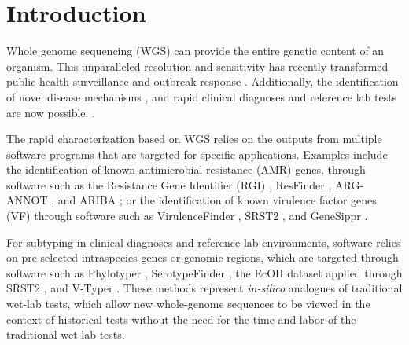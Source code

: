 \documentclass{article}
\begin{document}
\section{Introduction}

Whole genome sequencing (WGS) can provide the entire genetic content of an organism. This unparalleled resolution and sensitivity has recently transformed public-health surveillance and outbreak response \cite{ronholm2016navigating,lytsy2017time}. Additionally, the identification of novel disease mechanisms \cite{wang2014whole,yuen2015whole}, and rapid clinical diagnoses and reference lab tests are now possible. \cite{willig2015whole,dewey2014clinical}.

The rapid characterization based on WGS relies on the outputs from multiple software programs that are targeted for specific applications. Examples include the identification of known antimicrobial resistance (AMR) genes, through software such as the Resistance Gene Identifier (RGI) \cite{mcarthur2013comprehensive}, ResFinder \cite{kleinheinz2014applying}, ARG-ANNOT \cite{gupta2014arg}, and ARIBA \cite{hunt2017ariba}; or the identification of known virulence factor genes (VF) through software such as VirulenceFinder \cite{kleinheinz2014applying}, SRST2 \cite{inouye2014srst2}, and GeneSippr \cite{lambert2015genesippr}. 

For subtyping in clinical diagnoses and reference lab environments, software relies on pre-selected intraspecies genes or genomic regions, which are targeted through software such as Phylotyper \cite{whiteside2017phylotyper}, SerotypeFinder \cite{joensen2015rapid}, the EcOH dataset applied through SRST2 \cite{ingle2016silico}, and V-Typer \cite{carrillo2016comparative}. These methods represent \textit{in-silico} analogues of traditional wet-lab tests, which allow new whole-genome sequences to be viewed in the context of historical tests without the need for the time and labor of the traditional wet-lab tests.
\end{document}
